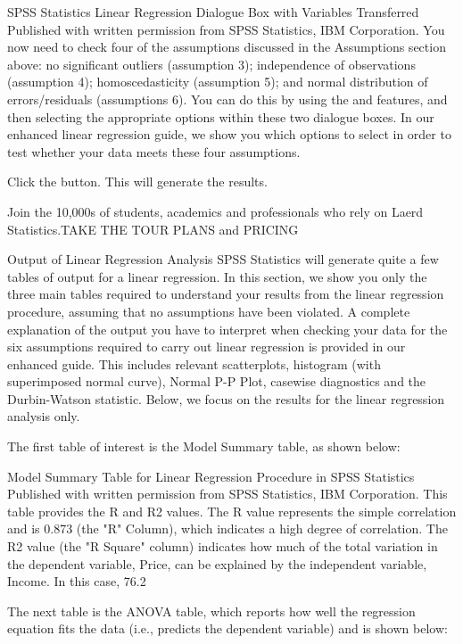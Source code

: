 \documentclass[]{article}
\begin{document}
	SPSS Statistics Linear Regression Dialogue Box with Variables Transferred
	Published with written permission from SPSS Statistics, IBM Corporation.
	You now need to check four of the assumptions discussed in the Assumptions section above: no significant outliers (assumption 3); independence of observations (assumption 4); homoscedasticity (assumption 5); and normal distribution of errors/residuals (assumptions 6). You can do this by using the  and  features, and then selecting the appropriate options within these two dialogue boxes. In our enhanced linear regression guide, we show you which options to select in order to test whether your data meets these four assumptions.
	
	Click the  button. This will generate the results.
	
	Join the 10,000s of students, academics and professionals who rely on Laerd Statistics.TAKE THE TOUR PLANS and PRICING
	
	Output of Linear Regression Analysis
	SPSS Statistics will generate quite a few tables of output for a linear regression. In this section, we show you only the three main tables required to understand your results from the linear regression procedure, assuming that no assumptions have been violated. A complete explanation of the output you have to interpret when checking your data for the six assumptions required to carry out linear regression is provided in our enhanced guide. This includes relevant scatterplots, histogram (with superimposed normal curve), Normal P-P Plot, casewise diagnostics and the Durbin-Watson statistic. Below, we focus on the results for the linear regression analysis only.
	
	The first table of interest is the Model Summary table, as shown below:
	
	Model Summary Table for Linear Regression Procedure in SPSS Statistics
	Published with written permission from SPSS Statistics, IBM Corporation.
	This table provides the R and R2 values. The R value represents the simple correlation and is 0.873 (the "R" Column), which indicates a high degree of correlation. The R2 value (the "R Square" column) indicates how much of the total variation in the dependent variable, Price, can be explained by the independent variable, Income. In this case, 76.2%
	
	The next table is the ANOVA table, which reports how well the regression equation fits the data (i.e., predicts the dependent variable) and is shown below:
	
\end{document}
